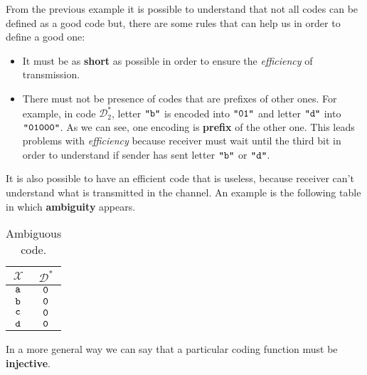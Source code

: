 From the previous example it is possible to understand that not all codes can be defined as a good code but, there are some rules that can help us in order to define a good one:
\begin{itemize}
	\item It must be as \textbf{short} as possible in order to ensure the \textit{efficiency} of transmission.
	\item There must not be presence of codes that are prefixes of other ones. For example, in code $\mathcal{D}^*_2$, letter $\verb|"b"|$ is encoded into $\verb|"01"|$ and letter $\verb|"d"|$ into $\verb|"01000"|$. As we can see, one encoding is \textbf{prefix} of the other one. This leads problems with \textit{efficiency} because receiver must wait until the third bit in order to understand if sender has sent letter $\verb|"b"|$ or $\verb|"d"|$.
\end{itemize}  
It is also possible to have an efficient code that is useless, because receiver can't understand what is transmitted in the channel. An example is the following table in which \textbf{ambiguity} appears.
\begin{table}[H]
	\centering
	\begin{tabular}{| c | c |}
		\hline
		$\mathcal{X}$ & $\mathcal{D}^*$\\\hline
		$\verb|a|$ & $\verb|0|$ \\
		$\verb|b|$ & $\verb|0|$ \\
		$\verb|c|$ & $\verb|0|$ \\
		$\verb|d|$ & $\verb|0|$ \\
		\hline
	\end{tabular}
	\caption{Ambiguous code.}
\end{table}
\par
In a more general way we can say that a particular coding function must be \textbf{injective}.


